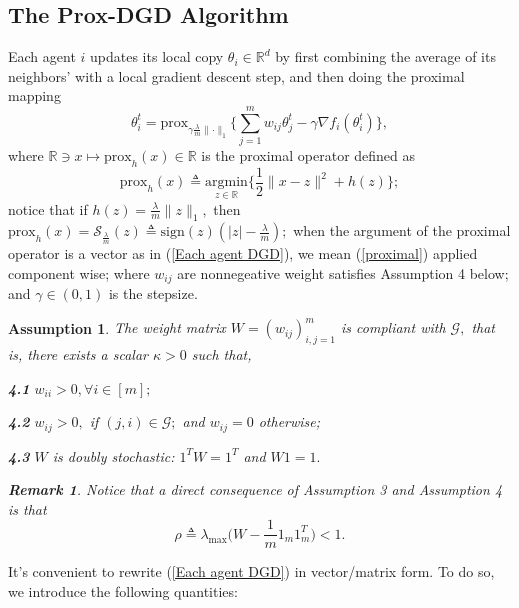 \documentclass{article}
\theoremstyle{break}
\newtheorem*{remark}{Remark}
\newtheorem{assumption}{Assumption}
\begin{document}
\subsection{The Prox-DGD Algorithm}
Each agent $i$ updates its local copy $\theta_i\in\mathbb{R}^d$
 by first combining the average of its neighbors' with a local gradient descent step, and then doing the proximal mapping
\begin{equation}\label{Each agent DGD}
    \theta^t_i=\text{prox}_{\gamma\frac{\lambda}{m}\lVert\cdot\rVert_1}\bigg\{\sum\limits_{j=1}^m w_{i j}\theta_j^t-\gamma\nabla f_i(\theta_i^t)\bigg\},
\end{equation}
where $\mathbb{R}\ni x\mapsto \text{prox}_{h}(x)\in \mathbb{R}$ is the proximal operator defined as
\begin{equation}\label{proximal}
    \text{prox}_{h}(x)\triangleq \underset{z\in\mathbb{R}}{\text{argmin}}\bigg\{\frac{1}{2}\lVert x-z\rVert^2+h(z)\bigg\};
\end{equation}
notice that if $h(z)=\frac{\lambda}{m}\lVert z\rVert_1,$ then $\text{prox}_{h}(x)=\mathcal{S}_{\frac{\lambda}{m}}(z)\triangleq\text{sign}(z)(\lvert z\rvert-\frac{\lambda}{m});$ 
when the argument of the proximal operator is a vector as in (\ref{Each agent DGD}), we mean (\ref{proximal}) applied component wise; where $w_{i j}$ are nonnegeative weight satisfies Assumption 4 below;
and $\gamma\in(0,1)$ is the stepsize.
\begin{assumption}
The weight matrix $W=(w_{i j})_{i,j=1}^m $ is compliant with $\mathcal{G},$ that is, there exists a scalar $\kappa>0 $ such that,
\item \textbf{4.1}
    $w_{ii}>0, \forall i\in [m];$ 
\item \textbf{4.2}
    $w_{i j}>0,$ if $(j,i)\in \mathcal{G};$ and  $w_{i j}=0$ otherwise;
\item \textbf{4.3}
    $W$ is doubly stochastic:  $1^{T}W=1^{T}$ and $W1=1.$

\begin{remark}
Notice that a direct consequence of Assumption 3 and Assumption 4 is that
\begin{equation}
    \rho\triangleq\lambda_{\max}\bigg(W-\frac{1}{m}1_m1_m^T\bigg)<1.
\end{equation}
\end{remark}
\end{assumption}



It's convenient to rewrite (\ref{Each agent DGD}) in vector/matrix form. To do so, we introduce the following quantities:
\end{document}
